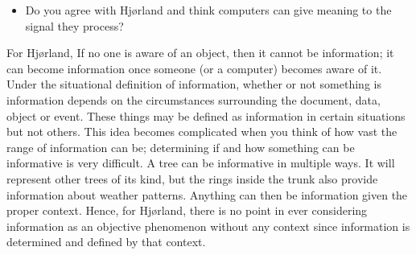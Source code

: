 \documentclass[
  letterpaper,
  DIV=11,
  numbers=noendperiod]{scrreprt}
\providecommand{\tightlist}{%
  \setlength{\itemsep}{0pt}\setlength{\parskip}{0pt}}
\begin{document}
\begin{tcolorbox}[enhanced jigsaw, arc=.35mm, bottomrule=.15mm, bottomtitle=1mm, breakable, colback=white, colbacktitle=quarto-callout-tip-color!10!white, colframe=quarto-callout-tip-color-frame, coltitle=black, left=2mm, leftrule=.75mm, opacityback=0, opacitybacktitle=0.6, rightrule=.15mm, title=\textcolor{quarto-callout-tip-color}{\faLightbulb}\hspace{0.5em}{Stop and reflect}, titlerule=0mm, toprule=.15mm, toptitle=1mm]

\begin{itemize}
\tightlist
\item
  Do you agree with Hjørland and think computers can give meaning to the
  signal they process?
\end{itemize}

\end{tcolorbox}

For Hjørland, If no one is aware of an object, then it cannot be
information; it can become information once someone (or a computer)
becomes aware of it. Under the situational definition of information,
whether or not something is information depends on the circumstances
surrounding the document, data, object or event. These things may be
defined as information in certain situations but not others. This idea
becomes complicated when you think of how vast the range of information
can be; determining if and how something can be informative is very
difficult. A tree can be informative in multiple ways. It will represent
other trees of its kind, but the rings inside the trunk also provide
information about weather patterns. Anything can then be information
given the proper context. Hence, for Hjørland, there is no point in ever
considering information as an objective phenomenon without any context
since information is determined and defined by that context.
\end{document}

